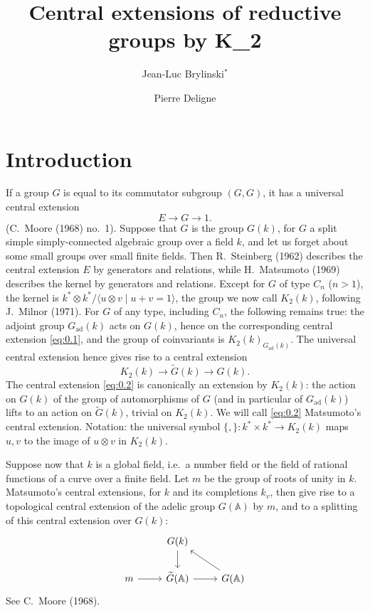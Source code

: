 \documentclass[11pt,a4paper]{article}
\theoremstyle{plain}
\theoremstyle{definition}
\newcommand{\bA}{\mathbb{A}}
\newcommand{\ad}{\mathrm{ad}}
\begin{document}
\title{Central extensions of reductive groups by K_2}
\author{Jean-Luc Brylinski$^*$ \and Pierre Deligne}
\date{}
\maketitle
{}

\tableofcontents

\section{Introduction}

If a group $G$ is equal to its commutator subgroup $(G,G)$, it has a universal central extension
\begin{equation}\label{eq:0.1}
E \to G \to 1.
\end{equation}
(C.~Moore (1968) no.~1). Suppose that $G$ is the group $G(k)$, for $G$ a split simple simply-connected algebraic group over a field $k$, and let us forget about some small groups over small finite fields. Then R.~Steinberg (1962) describes the central extension $E$ by generators and relations, while H.~Matsumoto (1969) describes the kernel by generators and relations. Except for $G$ of type $C_n$ ($n>1$), the kernel is $k^* \otimes k^*/\langle u \otimes v \mid u+v=1 \rangle$, the group we now call $K_2(k)$, following J.~Milnor (1971). For $G$ of any type, including $C_n$, the following remains true: the adjoint group $G_{\ad}(k)$ acts on $G(k)$, hence on the corresponding central extension \eqref{eq:0.1}, and the group of coinvariants is $K_2(k)_{G_{\ad}(k)}$. The universal central extension hence gives rise to a central extension
\begin{equation}\label{eq:0.2}
K_2(k) \to \widetilde{G}(k) \to G(k).
\end{equation}
The central extension \eqref{eq:0.2} is canonically an extension by $K_2(k)$: the action on $G(k)$ of the group of automorphisms of $G$ (and in particular of $G_{\ad}(k)$) lifts to an action on $\widetilde{G}(k)$, trivial on $K_2(k)$. We will call \eqref{eq:0.2} Matsumoto's central extension. Notation: the universal symbol $\{,\}: k^* \times k^* \to K_2(k)$ maps $u,v$ to the image of $u \otimes v$ in $K_2(k)$.

Suppose now that $k$ is a global field, i.e.~a number field or the field of rational functions of a curve over a finite field. Let $m$ be the group of roots of unity in $k$. Matsumoto's central extensions, for $k$ and its completions $k_v$, then give rise to a topological central extension of the adelic group $G(\bA)$ by $m$, and to a splitting of this central extension over $G(k)$:
\begin{equation}\label{eq:0.3}
\begin{tikzcd}
& G(k) \arrow[d] \\
m \arrow[r] & \widetilde{G}(\bA) \arrow[r] & G(\bA) \arrow[lu]
\end{tikzcd}
\end{equation}
See C.~Moore (1968).
\end{document}
